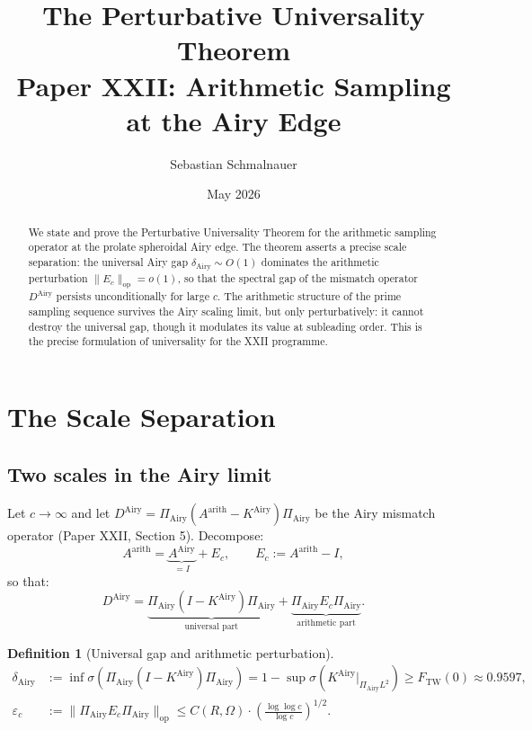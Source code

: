 \documentclass[12pt,a4paper]{amsart}
\title{The Perturbative Universality Theorem\\
{\normalsize Paper XXII: Arithmetic Sampling at the Airy Edge}}
\author{Sebastian Schmalnauer}
\date{May 2026}
\theoremstyle{definition}
\newtheorem{definition}[theorem]{Definition}
\newcommand{\KAi}{K^{\mathrm{Airy}}}
\newcommand{\DAi}{D^{\mathrm{Airy}}}
\newcommand{\PAi}{\Pi_{\mathrm{Airy}}}
\newcommand{\Aarith}{A^{\mathrm{arith}}}
\newcommand{\AAiry}{A^{\mathrm{Airy}}}
\newcommand{\norm}[1]{\|#1\|}
\newcommand{\Ec}{E_c}
\begin{document}
\maketitle

\begin{abstract}
We state and prove the Perturbative Universality Theorem for the
arithmetic sampling operator at the prolate spheroidal Airy edge.
The theorem asserts a precise scale separation:
the universal Airy gap $\delta_{\mathrm{Airy}} \sim O(1)$ dominates
the arithmetic perturbation $\|E_c\|_{\mathrm{op}} = o(1)$,
so that the spectral gap of the mismatch operator $\DAi$ persists
unconditionally for large $c$.
The arithmetic structure of the prime sampling sequence
survives the Airy scaling limit, but only perturbatively:
it cannot destroy the universal gap, though it modulates its value
at subleading order.
This is the precise formulation of universality for the XXII programme.
\end{abstract}

\tableofcontents

\section{The Scale Separation}
\label{sec:scales}

\subsection{Two scales in the Airy limit}

Let $c \to \infty$ and let $\DAi = \PAi(\Aarith - \KAi)\PAi$
be the Airy mismatch operator (Paper XXII, Section 5).
Decompose:
\begin{equation}\label{eq:decomp}
  \Aarith = \underbrace{\AAiry}_{= I} + \Ec,
  \qquad \Ec := \Aarith - I,
\end{equation}
so that:
\begin{equation}\label{eq:mismatch_decomp}
  \DAi
  = \underbrace{\PAi(I - \KAi)\PAi}_{\text{universal part}}
  + \underbrace{\PAi \Ec \PAi}_{\text{arithmetic part}}.
\end{equation}

\begin{definition}[Universal gap and arithmetic perturbation]
\begin{align}
  \delta_{\mathrm{Airy}}
  &:= \inf\sigma(\PAi(I - \KAi)\PAi)
   = 1 - \sup\sigma(\KAi|_{\PAi L^2})
   \ge F_{\mathrm{TW}}(0)
   \approx 0.9597,
  \label{eq:delta_def}\\
  \varepsilon_c
  &:= \norm{\PAi \Ec \PAi}_{\mathrm{op}}
   \le C(R,\Omega) \cdot \left(\frac{\log\log c}{\log c}\right)^{1/2}.
  \label{eq:eps_def}
\end{align}
\end{definition}
\end{document}
